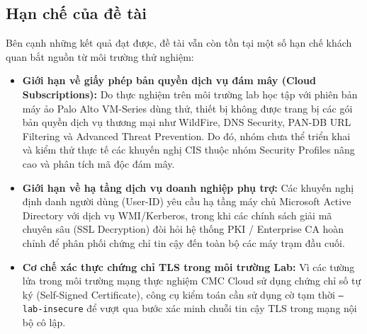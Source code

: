 \documentclass[12pt,a4paper]{article}
\begin{document}
\subsection{Hạn chế của đề tài}
\noindent Bên cạnh những kết quả đạt được, đề tài vẫn còn tồn tại một số hạn chế khách quan bắt nguồn từ môi trường thử nghiệm:
\begin{itemize}
    \item \textbf{Giới hạn về giấy phép bản quyền dịch vụ đám mây (Cloud Subscriptions):} Do thực nghiệm trên môi trường lab học tập với phiên bản máy ảo Palo Alto VM-Series dùng thử, thiết bị không được trang bị các gói bản quyền dịch vụ thương mại như WildFire, DNS Security, PAN-DB URL Filtering và Advanced Threat Prevention. Do đó, nhóm chưa thể triển khai và kiểm thử thực tế các khuyến nghị CIS thuộc nhóm Security Profiles nâng cao và phân tích mã độc đám mây.
    \item \textbf{Giới hạn về hạ tầng dịch vụ doanh nghiệp phụ trợ:} Các khuyến nghị định danh người dùng (User-ID) yêu cầu hạ tầng máy chủ Microsoft Active Directory với dịch vụ WMI/Kerberos, trong khi các chính sách giải mã chuyên sâu (SSL Decryption) đòi hỏi hệ thống PKI / Enterprise CA hoàn chỉnh để phân phối chứng chỉ tin cậy đến toàn bộ các máy trạm đầu cuối.
    \item \textbf{Cơ chế xác thực chứng chỉ TLS trong môi trường Lab:} Vì các tường lửa trong môi trường mạng thực nghiệm CMC Cloud sử dụng chứng chỉ số tự ký (Self-Signed Certificate), công cụ kiểm toán cần sử dụng cờ tạm thời \texttt{--lab-insecure} để vượt qua bước xác minh chuỗi tin cậy TLS trong mạng nội bộ cô lập.
\end{itemize}
\end{document}
